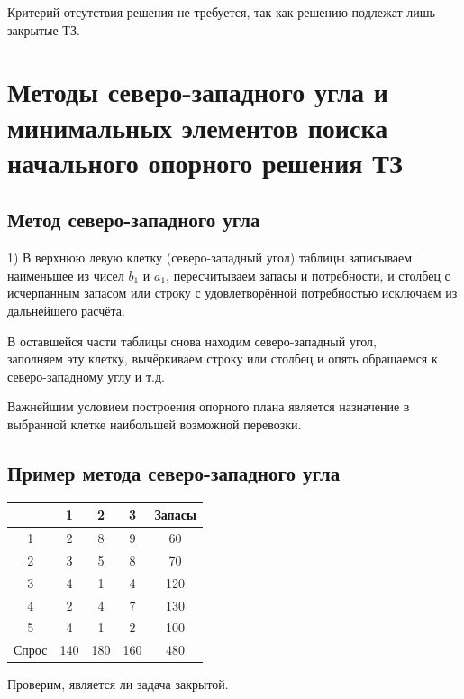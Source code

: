 \documentclass[17pt]{extarticle}
\begin{document}
Критерий отсутствия решения не требуется, так как решению подлежат лишь закрытые ТЗ.


\section{Методы северо-западного угла и минимальных элементов поиска начального опорного решения ТЗ}

\subsection{Метод северо-западного угла}
1) В верхнюю левую клетку (северо-западный угол) таблицы записываем наименьшее из чисел \( b_1 \) и \( a_1 \),
пересчитываем запасы и потребности,
и столбец с исчерпанным запасом или строку с удовлетворённой потребностью исключаем из дальнейшего расчёта.

В оставшейся части таблицы снова находим северо-западный угол, \\ заполняем эту клетку,
вычёркиваем строку или столбец и опять обращаемся к северо-западному углу и т.д.

Важнейшим условием построения опорного плана является назначение в выбранной клетке наибольшей возможной перевозки.

\subsection{Пример метода северо-западного угла}
\begin{center}
    \begin{tabular}{|c|c|c|c|c|}
        \hline
              & 1   & 2   & 3   & Запасы \\
        \hline
        1     & 2   & 8   & 9   & 60     \\
        \hline
        2     & 3   & 5   & 8   & 70     \\
        \hline
        3     & 4   & 1   & 4   & 120    \\
        \hline
        4     & 2   & 4   & 7   & 130    \\
        \hline
        5     & 4   & 1   & 2   & 100    \\
        \hline
        Спрос & 140 & 180 & 160 & 480    \\
        \hline
    \end{tabular}
\end{center}

Проверим, является ли задача закрытой.
\end{document}
